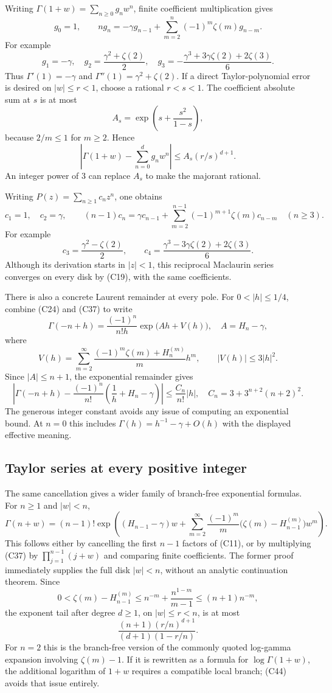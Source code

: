 Writing $\Gamma(1+w)=\sum_{n\geq0}g_nw^n$, finite coefficient
multiplication gives
\[
 g_0=1,\qquad
 ng_n=-\gamma g_{n-1}+
         \sum_{m=2}^n(-1)^m\zeta(m)g_{n-m}.
 \tag{C40}
\]
For example
\[
 g_1=-\gamma,\quad
 g_2=\frac{\gamma^2+\zeta(2)}2,\quad
 g_3=-\frac{\gamma^3+3\gamma\zeta(2)+2\zeta(3)}6.
\]
Thus $\Gamma'(1)=-\gamma$ and
$\Gamma''(1)=\gamma^2+\zeta(2)$.
If a direct Taylor-polynomial error is desired on $|w|\leq r<1$,
choose a rational $r<s<1$.  The coefficient absolute sum at $s$ is at
most
\[
 A_s=\exp\left(s+\frac{s^2}{1-s}\right),
\]
because $2/m\leq1$ for $m\geq2$.  Hence
\[
 \left|\Gamma(1+w)-\sum_{n=0}^d g_nw^n\right|
 \leq A_s(r/s)^{d+1}.
 \tag{C41}
\]
An integer power of $3$ can replace $A_s$ to make the majorant rational.

Writing $P(z)=\sum_{n\geq1}c_nz^n$, one obtains
\[
 c_1=1,\quad c_2=\gamma,\qquad
 (n-1)c_n=\gamma c_{n-1}+
    \sum_{m=2}^{n-1}(-1)^{m+1}\zeta(m)c_{n-m}\quad(n\geq3).
 \tag{C42}
\]
For example
\[
 c_3=\frac{\gamma^2-\zeta(2)}2,\qquad
 c_4=\frac{\gamma^3-3\gamma\zeta(2)+2\zeta(3)}6.
\]
Although its derivation starts in $|z|<1$, this reciprocal Maclaurin
series converges on every disk by (C19), with the same coefficients.

There is also a concrete Laurent remainder at every pole.  For
$0<|h|\leq1/4$, combine (C24) and (C37) to write
\[
 \Gamma(-n+h)=\frac{(-1)^n}{n!h}\exp\bigl(Ah+V(h)\bigr),
 \quad A=H_n-\gamma,
\]
where
\[
 V(h)=\sum_{m=2}^{\infty}
 \frac{(-1)^m\zeta(m)+H_n^{(m)}}m h^m,
 \qquad |V(h)|\leq3|h|^2.
\]
Since $|A|\leq n+1$, the exponential remainder gives
\[
 \left|\Gamma(-n+h)-\frac{(-1)^n}{n!}
       \left(\frac1h+H_n-\gamma\right)\right|
 \leq\frac{C_n}{n!}|h|,
 \quad C_n=3+3^{n+2}(n+2)^2.
 \tag{C43}
\]
The generous integer constant avoids any issue of computing an
exponential bound.  At $n=0$ this includes
$\Gamma(h)=h^{-1}-\gamma+O(h)$ with the displayed effective meaning.

\subsection{Taylor series at every positive integer}
The same cancellation gives a wider family of branch-free exponential
formulas.  For $n\geq1$ and $|w|<n$,
\[
 \Gamma(n+w)=(n-1)!\exp\!\left((H_{n-1}-\gamma)w+
   \sum_{m=2}^{\infty}\frac{(-1)^m}{m}
          \bigl(\zeta(m)-H_{n-1}^{(m)}\bigr)w^m\right).
 \tag{C44}
\]
This follows either by cancelling the first $n-1$ factors of (C11),
or by multiplying (C37) by $\prod_{j=1}^{n-1}(j+w)$ and comparing
finite coefficients.  The former proof immediately supplies the full
disk $|w|<n$, without an analytic continuation theorem.  Since
\[
 0<\zeta(m)-H_{n-1}^{(m)}
       \leq n^{-m}+\frac{n^{1-m}}{m-1}\leq(n+1)n^{-m},
\]
the exponent tail after degree $d\geq1$, on $|w|\leq r<n$, is at most
\[
 \frac{(n+1)(r/n)^{d+1}}{(d+1)(1-r/n)}.
 \tag{C45}
\]
For $n=2$ this is the branch-free version of the commonly quoted
log-gamma expansion involving $\zeta(m)-1$.  If it is rewritten as a
formula for $\log\Gamma(1+w)$, the additional logarithm of $1+w$
requires a compatible local branch; (C44) avoids that issue entirely.


